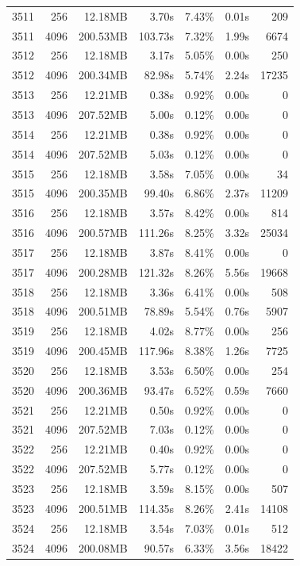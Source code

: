 ﻿\documentclass{sysuthesis}
\begin{document}
\begin{longtable}{crrrrrr}
	3511 & 256 & 12.18MB & 3.70s & 7.43\% & 0.01s & 209 \\
	3511 & 4096 & 200.53MB & 103.73s & 7.32\% & 1.99s & 6674 \\
	3512 & 256 & 12.18MB & 3.17s & 5.05\% & 0.00s & 250 \\
	3512 & 4096 & 200.34MB & 82.98s & 5.74\% & 2.24s & 17235 \\
	3513 & 256 & 12.21MB & 0.38s & 0.92\% & 0.00s & 0 \\
	3513 & 4096 & 207.52MB & 5.00s & 0.12\% & 0.00s & 0 \\
	3514 & 256 & 12.21MB & 0.38s & 0.92\% & 0.00s & 0 \\
	3514 & 4096 & 207.52MB & 5.03s & 0.12\% & 0.00s & 0 \\
	3515 & 256 & 12.18MB & 3.58s & 7.05\% & 0.00s & 34 \\
	3515 & 4096 & 200.35MB & 99.40s & 6.86\% & 2.37s & 11209 \\
	3516 & 256 & 12.18MB & 3.57s & 8.42\% & 0.00s & 814 \\
	3516 & 4096 & 200.57MB & 111.26s & 8.25\% & 3.32s & 25034 \\
	3517 & 256 & 12.18MB & 3.87s & 8.41\% & 0.00s & 0 \\
	3517 & 4096 & 200.28MB & 121.32s & 8.26\% & 5.56s & 19668 \\
	3518 & 256 & 12.18MB & 3.36s & 6.41\% & 0.00s & 508 \\
	3518 & 4096 & 200.51MB & 78.89s & 5.54\% & 0.76s & 5907 \\
	3519 & 256 & 12.18MB & 4.02s & 8.77\% & 0.00s & 256 \\
	3519 & 4096 & 200.45MB & 117.96s & 8.38\% & 1.26s & 7725 \\
	3520 & 256 & 12.18MB & 3.53s & 6.50\% & 0.00s & 254 \\
	3520 & 4096 & 200.36MB & 93.47s & 6.52\% & 0.59s & 7660 \\
	3521 & 256 & 12.21MB & 0.50s & 0.92\% & 0.00s & 0 \\
	3521 & 4096 & 207.52MB & 7.03s & 0.12\% & 0.00s & 0 \\
	3522 & 256 & 12.21MB & 0.40s & 0.92\% & 0.00s & 0 \\
	3522 & 4096 & 207.52MB & 5.77s & 0.12\% & 0.00s & 0 \\
	3523 & 256 & 12.18MB & 3.59s & 8.15\% & 0.00s & 507 \\
	3523 & 4096 & 200.51MB & 114.35s & 8.26\% & 2.41s & 14108 \\
	3524 & 256 & 12.18MB & 3.54s & 7.03\% & 0.01s & 512 \\
	3524 & 4096 & 200.08MB & 90.57s & 6.33\% & 3.56s & 18422 \\
\end{longtable}
\end{document}
